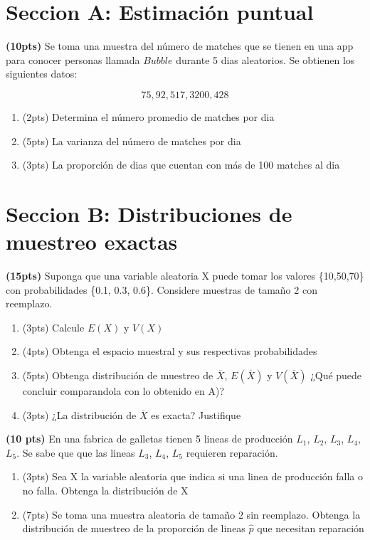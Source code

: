 \documentclass[addpoints]{exam}
\theoremstyle{mytheor}
\begin{document}
\begin{questions} 

\section*{Seccion A: Estimación puntual}

\question \textbf{(10pts)} Se toma una muestra del número de matches que se tienen en una app para conocer personas llamada $Bubble$ durante 5 dias aleatorios. Se obtienen los siguientes datos:

$$75, 92, 517, 3200, 428$$

\begin{enumerate}[label=\Alph*)]
\item (2pts) Determina el número promedio de matches por dia
\item (5pts) La varianza del número de matches por dia
\item (3pts) La proporción de dias que cuentan con más de 100 matches al dia
\end{enumerate}

\section*{Seccion B: Distribuciones de muestreo exactas}

\question \textbf{(15pts)} Suponga que una variable aleatoria X puede tomar los valores \{10,50,70\} con probabilidades \{0.1, 0.3, 0.6\}. Considere muestras de tamaño 2 con reemplazo.
  
  \begin{enumerate}[label=\Alph*)]
  \item (3pts) Calcule $E(X)$ y $V(X)$
  \item (4pts) Obtenga el espacio muestral y sus respectivas probabilidades
  \item (5pts) Obtenga distribución de muestreo de $\overline{X}$, $E(\overline{X})$ y $V(\overline{X})$ ¿Qué puede concluir comparandola con lo obtenido en A)?
  \item (3pts) ¿La distribución de $\overline{X}$ es exacta? Justifique
  \end{enumerate}

 \question \textbf{(10 pts)} En una fabrica de galletas tienen 5 lineas de producción $L_1$, $L_2$, $L_3$, $L_4$, $L_5$. Se sabe que que las lineas $L_3$, $L_4$, $L_5$ requieren reparación.

  \begin{enumerate}[label=\Alph*)]
  \item (3pts) Sea X la variable aleatoria que indica si una linea de producción falla o no falla. Obtenga la distribución de X
  \item (7pts) Se toma una muestra aleatoria de tamaño 2 sin reemplazo. Obtenga la distribución de muestreo de la proporción de lineas $\hat{p}$ que necesitan reparación
  \end{enumerate}


\end{questions}
\end{document}
